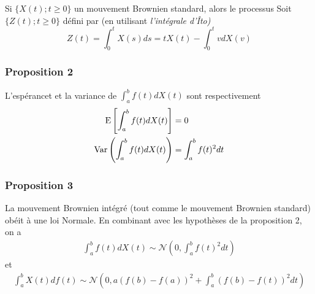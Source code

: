 \documentclass[10pt, french, landscape]{article}
\begin{document}
\begin{multicols*}{3}
\begin{definition}
Si $\{X(t) ; t \geq 0 \}$ un mouvement Brownien standard, alors le processus Soit $\{Z(t) ; t \geq 0 \}$ défini par (en utilisant \emph{l'intégrale d'Îto)}
\[Z(t) = \int_{0}^{t} X(s) ds = t X(t) - \int_{0}^{t} v d X(v) \]
\end{definition}


\subsubsection*{Proposition 2}
L'espérancet et la variance de $\int_{a}^{b} f(t) d X(t) $ sont respectivement
\begin{align*}
\mathrm{E} \left[ \int_{a}^{b} f(t) d X(t)  \right] & = 0 \\
\mathrm{Var} \left( \int_{a}^{b} f(t) d X(t)   \right) & =  \int_{a}^{b} f(t)^2 dt \\
\end{align*}


\subsubsection*{Proposition 3}
La mouvement Brownien intégré (tout comme le mouvement Brownien standard) obéit à une loi Normale. En combinant avec les hypothèses de la proposition 2, on a
\begin{align*}
\int_{a}^{b} f(t) d X(t) \sim \mathcal{N} \left( 0 , \int_{a}^{b} f(t)^2 dt \right)
\end{align*}
et
\begin{align*}
\int_{a}^{b} X(t) d f(t) \sim \mathcal{N} \left( 0, a\left(f(b) - f(a)\right)^2 + \int_{a}^{b} \left( f(b) - f(t) \right)^2 dt \right)
\end{align*}





\end{multicols*}

\end{document}
